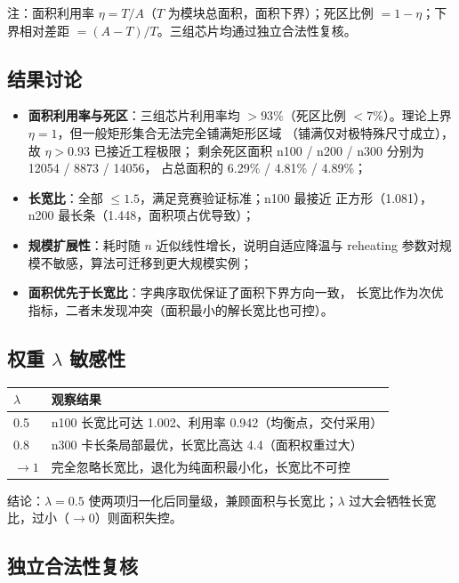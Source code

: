 \documentclass[12pt,a4paper]{article}
\begin{document}
注：面积利用率 $\eta = T/A$（$T$ 为模块总面积，面积下界）；死区比例
$= 1 - \eta$；下界相对差距 $= (A - T)/T$。三组芯片均通过独立合法性复核。

\subsection{结果讨论}

\begin{itemize}
    \item \textbf{面积利用率与死区}：三组芯片利用率均 $> 93\%$（死区比例
    $< 7\%$）。理论上界 $\eta = 1$，但一般矩形集合无法完全铺满矩形区域
    （铺满仅对极特殊尺寸成立），故 $\eta > 0.93$ 已接近工程极限；
    剩余死区面积 n100 / n200 / n300 分别为 12054 / 8873 / 14056，
    占总面积的 6.29\% / 4.81\% / 4.89\%；
    \item \textbf{长宽比}：全部 $\le 1.5$，满足竞赛验证标准；n100 最接近
    正方形（1.081），n200 最长条（1.448，面积项占优导致）；
    \item \textbf{规模扩展性}：耗时随 $n$ 近似线性增长，说明自适应降温与
    reheating 参数对规模不敏感，算法可迁移到更大规模实例；
    \item \textbf{面积优先于长宽比}：字典序取优保证了面积下界方向一致，
    长宽比作为次优指标，二者未发现冲突（面积最小的解长宽比也可控）。
\end{itemize}

\subsection{权重 $\lambda$ 敏感性}
\label{sec:lambda}

\begin{table}[H]
\centering
\small
\begin{tabular}{ll}
\toprule
$\lambda$ & 观察结果 \\
\midrule
0.5 & n100 长宽比可达 1.002、利用率 0.942（均衡点，交付采用） \\
0.8 & n300 卡长条局部最优，长宽比高达 4.4（面积权重过大） \\
$\to 1$ & 完全忽略长宽比，退化为纯面积最小化，长宽比不可控 \\
\bottomrule
\end{tabular}
\end{table}

结论：$\lambda = 0.5$ 使两项归一化后同量级，兼顾面积与长宽比；$\lambda$
过大会牺牲长宽比，过小（$\to 0$）则面积失控。

\subsection{独立合法性复核}
\end{document}
